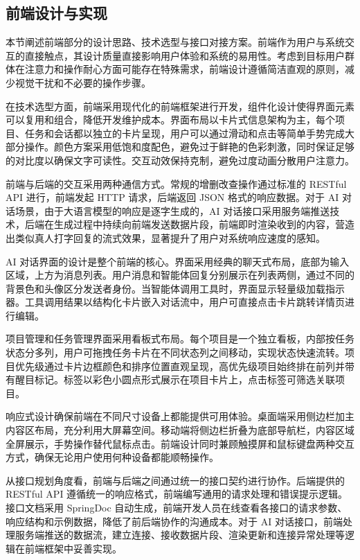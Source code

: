 
\subsection{前端设计与实现}

\par 本节阐述前端部分的设计思路、技术选型与接口对接方案。前端作为用户与系统交互的直接触点，其设计质量直接影响用户体验和系统的易用性。考虑到目标用户群体在注意力和操作耐心方面可能存在特殊需求，前端设计遵循简洁直观的原则，减少视觉干扰和不必要的操作步骤。

\par 在技术选型方面，前端采用现代化的前端框架进行开发，组件化设计使得界面元素可以复用和组合，降低开发维护成本。界面布局以卡片式信息架构为主，每个项目、任务和会话都以独立的卡片呈现，用户可以通过滑动和点击等简单手势完成大部分操作。颜色方案采用低饱和度配色，避免过于鲜艳的色彩刺激，同时保证足够的对比度以确保文字可读性。交互动效保持克制，避免过度动画分散用户注意力。

\par 前端与后端的交互采用两种通信方式。常规的增删改查操作通过标准的 RESTful API 进行，前端发起 HTTP 请求，后端返回 JSON 格式的响应数据。对于 AI 对话场景，由于大语言模型的响应是逐字生成的，AI 对话接口采用服务端推送技术，后端在生成过程中持续向前端发送数据片段，前端即时渲染收到的内容，营造出类似真人打字回复的流式效果，显著提升了用户对系统响应速度的感知。

\par AI 对话界面的设计是整个前端的核心。界面采用经典的聊天式布局，底部为输入区域，上方为消息列表。用户消息和智能体回复分别展示在列表两侧，通过不同的背景色和头像区分发送者身份。当智能体调用工具时，界面显示轻量级加载指示器。工具调用结果以结构化卡片嵌入对话流中，用户可直接点击卡片跳转详情页进行编辑。

\par 项目管理和任务管理界面采用看板式布局。每个项目是一个独立看板，内部按任务状态分多列，用户可拖拽任务卡片在不同状态列之间移动，实现状态快速流转。项目优先级通过卡片边框颜色和排序位置直观呈现，高优先级项目始终排在前列并带有醒目标记。标签以彩色小圆点形式展示在项目卡片上，点击标签可筛选关联项目。

\par 响应式设计确保前端在不同尺寸设备上都能提供可用体验。桌面端采用侧边栏加主内容区布局，充分利用大屏幕空间。移动端将侧边栏折叠为底部导航栏，内容区域全屏展示，手势操作替代鼠标点击。前端设计同时兼顾触摸屏和鼠标键盘两种交互方式，确保无论用户使用何种设备都能顺畅操作。

\par 从接口规划角度看，前端与后端之间通过统一的接口契约进行协作。后端提供的 RESTful API 遵循统一的响应格式，前端编写通用的请求处理和错误提示逻辑。接口文档采用 SpringDoc 自动生成，前端开发人员在线查看各接口的请求参数、响应结构和示例数据，降低了前后端协作的沟通成本。对于 AI 对话接口，前端处理服务端推送的数据流，建立连接、接收数据片段、渲染更新和连接异常处理等逻辑在前端框架中妥善实现。


